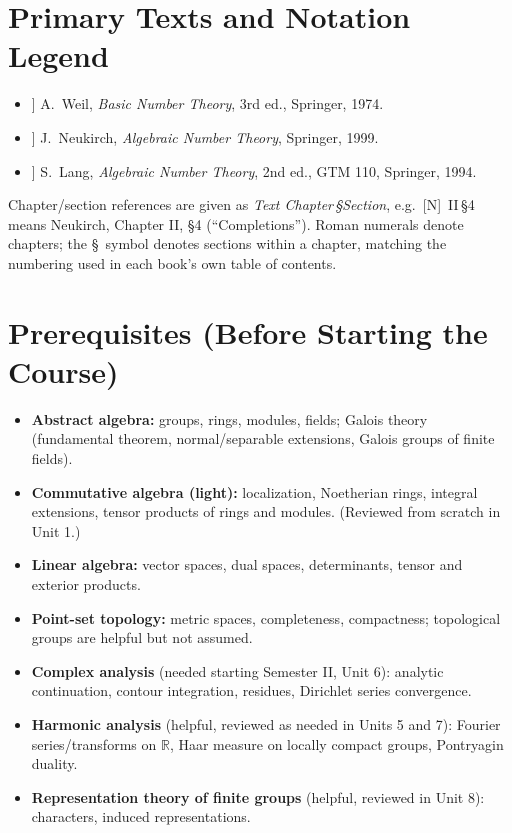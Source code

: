 \documentclass[11pt]{article}
\newcommand{\W}{[\textsc{W}]}
\newcommand{\N}{[\textsc{N}]}
\newcommand{\Lg}{[\textsc{L}]}
\begin{document}
\section{Primary Texts and Notation Legend}
\begin{itemize}[leftmargin=2.2cm]
\item[\W] A.\ Weil, \emph{Basic Number Theory}, 3rd ed., Springer, 1974.
\item[\N] J.\ Neukirch, \emph{Algebraic Number Theory}, Springer, 1999.
\item[\Lg] S.\ Lang, \emph{Algebraic Number Theory}, 2nd ed., GTM 110, Springer, 1994.
\end{itemize}
Chapter/section references are given as \emph{Text Chapter\,\S Section}, e.g.\ \N~II\,\S4 means Neukirch, Chapter II, \S4 (``Completions''). Roman numerals denote chapters; the \S\ symbol denotes sections within a chapter, matching the numbering used in each book's own table of contents.

\section{Prerequisites (Before Starting the Course)}
\begin{itemize}
\item \textbf{Abstract algebra:} groups, rings, modules, fields; Galois theory (fundamental theorem, normal/separable extensions, Galois groups of finite fields).
\item \textbf{Commutative algebra (light):} localization, Noetherian rings, integral extensions, tensor products of rings and modules. (Reviewed from scratch in Unit 1.)
\item \textbf{Linear algebra:} vector spaces, dual spaces, determinants, tensor and exterior products.
\item \textbf{Point-set topology:} metric spaces, completeness, compactness; topological groups are helpful but not assumed.
\item \textbf{Complex analysis} (needed starting Semester II, Unit 6): analytic continuation, contour integration, residues, Dirichlet series convergence.
\item \textbf{Harmonic analysis} (helpful, reviewed as needed in Units 5 and 7): Fourier series/transforms on $\mathbb{R}$, Haar measure on locally compact groups, Pontryagin duality.
\item \textbf{Representation theory of finite groups} (helpful, reviewed in Unit 8): characters, induced representations.
\end{itemize}
\end{document}

